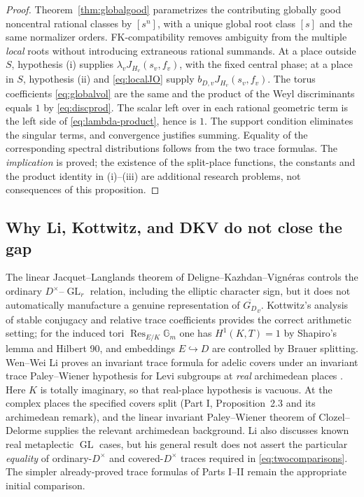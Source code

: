 \documentclass[11pt]{article}
\newcommand{\GL}{\operatorname{GL}}
\newcommand{\GDb}{\overline{G_D}}
\theoremstyle{plain}
\theoremstyle{definition}
\begin{document}
\begin{proof}
Theorem~\ref{thm:globalgood} parametrizes the contributing
globally good noncentral rational classes by $[s^n]$, with a
unique global root class $[s]$ and the same normalizer orders.
FK-compatibility removes ambiguity from the multiple \emph{local}
roots without introducing extraneous rational summands.
At a place outside $S$, hypothesis (i) supplies
$\lambda_v J_{H_v}(s_v,f_v)$, with the fixed central phase;
at a place in $S$, hypothesis (ii) and \eqref{eq:localJO}
supply $b_{D,v}J_{H_v}(s_v,f_v)$.  The torus coefficients
\eqref{eq:globalvol} are the same and the product of the Weyl
discriminants equals $1$ by \eqref{eq:discprod}.
The scalar left over in each rational geometric term is the
left side of \eqref{eq:lambda-product}, hence is $1$.
The support condition eliminates the singular terms, and
convergence justifies summing.  Equality of the corresponding
spectral distributions follows from the two trace formulas.
The \emph{implication} is proved; the existence of the split-place
functions, the constants and the product identity in (i)--(iii)
are additional research problems, not consequences of this proposition.
\end{proof}

\subsection{Why Li, Kottwitz, and DKV do not close the gap}\label{subsec:litroute}
The linear Jacquet--Langlands theorem of
Deligne--Kazhdan--Vign\'eras \cite{DKV} controls the ordinary
$D^\times$--$\GL_r$ relation, including the elliptic character
sign, but it does not automatically manufacture a genuine
representation of $\GDb_v$.  Kottwitz's analysis of stable
conjugacy and relative trace coefficients \cite{Kottwitz84}
provides the correct arithmetic setting; for the induced tori
$\operatorname{Res}_{E/K}\mathbb G_m$ one has
$H^1(K,T)=1$ by Shapiro's lemma and Hilbert 90, and embeddings
$E\hookrightarrow D$ are controlled by Brauer splitting.
Wen--Wei Li proves an invariant trace formula for adelic covers
under an invariant trace Paley--Wiener hypothesis for Levi subgroups
at \emph{real} archimedean places \cite{Li14}.  Here $K$ is totally
imaginary, so that real-place hypothesis is vacuous.  At the complex
places the specified covers split (Part I, Proposition~2.3 and its
archimedean remark), and the linear invariant Paley--Wiener theorem
of Clozel--Delorme \cite{ClozelDelorme} supplies the relevant
archimedean background.  Li also discusses known real metaplectic
$\GL$ cases, but his general result does not assert the particular
\emph{equality} of ordinary-$D^\times$ and covered-$D^\times$
traces required in \eqref{eq:twocomparisons}.  The simpler already-proved trace formulas
of Parts I--II remain the appropriate initial comparison.
\end{document}
